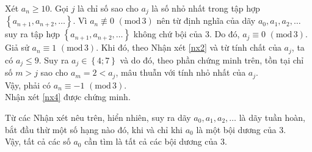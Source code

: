 \begin{bt}
{\begin{cm}
			Xét $a_n\geq 10$. Gọi $j$ là chỉ số sao cho $a_j$ là số nhỏ nhất trong tập hợp $\left\{a_{n+1}, a_{n+2}, \ldots\right\}$. Vì $a_n\not\equiv 0\,\, (\mbox{mod}\,3)$ nên từ định nghĩa của dãy $a_0, a_1, a_2, \ldots$ suy ra tập hợp $\left\{a_{n+1}, a_{n+2}, \ldots\right\}$ không chứ bội của $3$. Do đó, $a_j\equiv 0\,\, (\mbox{mod}\,3)$. Giả sử $a_n\equiv 1\,\, (\mbox{mod}\,3)$. Khi đó, theo Nhận xét \ref{nx2} và từ tính chất của $a_j$, ta có $a_j\leq 9$. Suy ra $a_j\in \left\{4;7\right\}$ và do đó, theo phần chứng minh trên, tồn tại chỉ số $m>j$ sao cho $a_m=2<a_j$, mâu thuẫn với tính nhỏ nhất của $a_j$.\\
			Vậy, phải có $a_n\equiv -1\,\, (\mbox{mod}\,3)$.\\
			Nhận xét \ref{nx4} được chứng minh.
		\end{cm}
		Từ các Nhận xét nêu trên, hiển nhiên, suy ra dãy $a_0, a_1, a_2, \ldots$ là dãy tuần hoàn, bắt đầu thừ một số hạng nào đó, khi và chỉ khi $a_0$ là một bội dương của $3$.\\
		Vậy, tất cả các số $a_0$ cần tìm là tất cả các bội dương của $3$.}
\end{bt}
